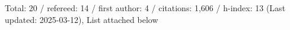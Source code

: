 Total: 20 / refereed: 14 / first author: 4 / citations: 1,606 / h-index: 13 (Last updated: 2025-03-12), List attached below